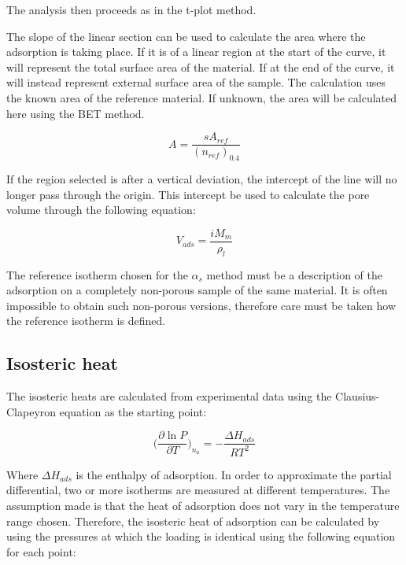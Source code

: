 The analysis then proceeds as in the t-plot method.

The slope of the linear section can be used to calculate the area
where the adsorption is taking place. If it is of a linear region
at the start of the curve, it will represent the total surface area
of the material. If at the end of the curve, it will instead
represent external surface area of the sample.
The calculation uses the known area of the reference material.
If unknown, the area will be calculated here using the BET method.

\begin{equation}
	A = \frac{s A_{ref}}{(n_{ref})_{0.4}}
\end{equation}


If the region selected is after a vertical deviation, the intercept of the line
will no longer pass through the origin. This intercept be used to calculate the
pore volume through the following equation:

\begin{equation}
	V_{ads} = \frac{i M_m}{\rho_{l}}
\end{equation}


The reference isotherm chosen for the \(\alpha_s\) method must be a description
of the adsorption on a completely non-porous sample of the same material. It is
often impossible to obtain such non-porous versions, therefore care must be taken how the reference isotherm is defined.


\subsection{Isosteric heat}

The isosteric heats are calculated from experimental data using the Clausius-Clapeyron
equation as the starting point:

\begin{equation}
    \Big( \frac{\partial \ln P}{\partial T} \Big)_{n_a} = -\frac{\Delta H_{ads}}{R T^2}
\end{equation}

Where \(\Delta H_{ads}\) is the enthalpy of adsorption. In order to approximate the
partial differential, two or more isotherms are measured at different temperatures. The
assumption made is that the heat of adsorption does not vary in the temperature range
chosen. Therefore, the isosteric heat of adsorption can be calculated by using the pressures
at which the loading is identical using the following equation for each point:

